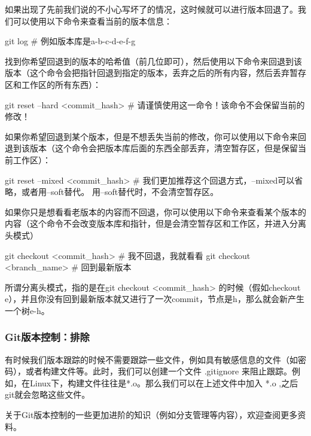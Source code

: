\documentclass[12pt]{report}
\begin{document}
如果出现了先前我们说的不小心写坏了的情况，这时候就可以进行版本回退了。我们可以使用以下命令来查看当前的版本信息：

\begin{codebox}[title=查看版本信息]
    git log # 例如版本库是a-b-c-d-e-f-g
\end{codebox}

找到你希望回退到的版本的哈希值（前几位即可），然后使用以下命令来回退到该版本（这个命令会把指针回退到指定的版本，丢弃之后的所有内容，然后丢弃暂存区和工作区的所有东西）：

\begin{codebox}[title=回退到某个版本]
    git reset --hard <commit_hash> # 请谨慎使用这一命令！该命令不会保留当前的修改！
\end{codebox}

如果你希望回退到某个版本，但是不想丢失当前的修改，你可以使用以下命令来回退到该版本（这个命令会把版本库后面的东西全部丢弃，清空暂存区，但是保留当前工作区）：
\begin{codebox}[title=回退到某个版本]
    git reset --mixed <commit_hash> # 我们更加推荐这个回退方式，--mixed可以省略，或者用--soft替代。
    用--soft替代时，不会清空暂存区。
\end{codebox}

如果你只是想看看老版本的内容而不回退，你可以使用以下命令来查看某个版本的内容（这个命令不会改变版本库和指针，但是会清空暂存区和工作区，并进入分离头模式）

\begin{codebox}[title=查看某个版本的内容]
    git checkout <commit_hash> # 我不回退，我就看看
    git checkout <branch_name> # 回到最新版本
\end{codebox}

所谓分离头模式，指的是在git checkout <commit\_hash> 的时候（假如checkout e），并且你没有回到最新版本就又进行了一次commit，节点是h，那么就会新产生一个树e-h。

\subsubsection{Git版本控制：排除}

有时候我们版本跟踪的时候不需要跟踪一些文件，例如具有敏感信息的文件（如密码），或者构建文件等。此时，我们可以创建一个文件 .gitignore 来阻止跟踪。例如，在Linux下，构建文件往往是*.o。那么我们可以在上述文件中加入 *.o ,之后git就会忽略这些文件。

关于Git版本控制的一些更加进阶的知识（例如分支管理等内容），欢迎查阅更多资料。
\end{document}
